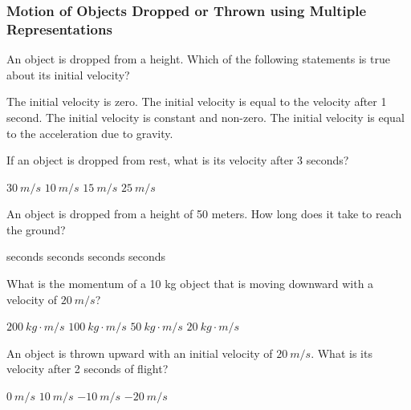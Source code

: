 \documentclass[]{exam}
\theoremstyle{definition}
\begin{document}
\clearpage

\subsubsection*{Motion of Objects Dropped or Thrown using Multiple Representations}

\begin{questions}
\question  
An object is dropped from a height. Which of the following statements is true about its initial velocity?  

\begin{randomizechoices}  
    \correctchoice The initial velocity is zero.  
    \choice The initial velocity is equal to the velocity after 1 second.  
    \choice The initial velocity is constant and non-zero.  
    \choice The initial velocity is equal to the acceleration due to gravity.  
\end{randomizechoices}  

\question  
If an object is dropped from rest, what is its velocity after 3 seconds?  

\begin{randomizechoices}  
    \correctchoice \(\SI{30}{m/s}\)  
    \choice \(\SI{10}{m/s}\)  
    \choice \(\SI{15}{m/s}\)  
    \choice \(\SI{25}{m/s}\)  
\end{randomizechoices}  


\question  
An object is dropped from a height of 50 meters. How long does it take to reach the ground?  

\begin{randomizechoices}  
     seconds  
     seconds  
     seconds  
     seconds  
\end{randomizechoices}  


\question  
What is the momentum of a 10 kg object that is moving downward with a velocity of \(\SI{20}{m/s}\)?  

\begin{randomizechoices}  
    \correctchoice \(\SI{200}{kg \cdot m/s}\)  
    \choice \(\SI{100}{kg \cdot m/s}\)  
    \choice \(\SI{50}{kg \cdot m/s}\)  
    \choice \(\SI{20}{kg \cdot m/s}\)  
\end{randomizechoices}  


\question  
An object is thrown upward with an initial velocity of \(\SI{20}{m/s}\). What is its velocity after 2 seconds of flight?  

\begin{randomizechoices}  
    \correctchoice \(\SI{0}{m/s}\)  
    \choice \(\SI{10}{m/s}\)  
    \choice \(\SI{-10}{m/s}\)  
    \choice \(\SI{-20}{m/s}\)  
\end{randomizechoices}  



\end{questions}
\end{document}
